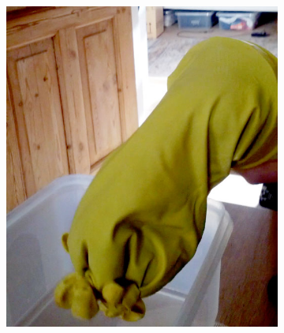 \begin{figure}[h]
  \centering
  \begin{subfigure}[t]{.28\textwidth}
    \centering
    \includegraphics[width=\linewidth]{figures/jamming/concepts/blobs/glove-1.jpg}
    \label{fig:ch:jamming:concepts:blobs:g1}
  \end{subfigure}%
  \hspace{0.03\textwidth}
  \begin{subfigure}[t]{.28\textwidth}
    \centering

\end{subfigure}
\end{figure}

